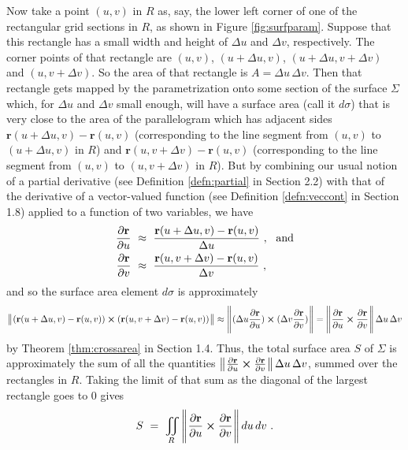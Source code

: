 Now take a point $(u,v)$ in $R$ as, say,
the lower left corner of one of the rectangular grid sections in $R$, as shown in Figure \ref{fig:surfparam}. Suppose
that this rectangle has a small width and height of $\Delta u$ and $\Delta v$, respectively. The corner points of that
rectangle are $(u,v)$, $(u+\Delta u,v)$, $(u+\Delta u,v+\Delta v)$ and $(u,v+\Delta v)$.
So the area of that
rectangle is $A = \Delta u\,\Delta v$. Then that rectangle gets mapped by the parametrization onto some section of the
surface $\Sigma$ which, for $\Delta u$ and $\Delta v$ small enough, will have a surface area (call it $d\sigma$) that
is very close to the area of the parallelogram which has adjacent sides $\mathbf{r}(u+\Delta u,v) - \mathbf{r}(u,v)$
(corresponding to the line segment from $(u,v)$ to $(u+\Delta u,v)$ in $R$) and
$\mathbf{r}(u,v+\Delta v) - \mathbf{r}(u,v)$ (corresponding to the line segment from $(u,v)$ to $(u,v+\Delta v)$ in
$R$). But by combining our usual notion of a partial derivative (see Definition \ref{defn:partial} in
Section 2.2) with that of the derivative of a vector-valued function (see Definition \ref{defn:veccont} in
Section 1.8) applied to a function of two variables, we have
\begin{align*}
 \frac{\partial \mathbf{r}}{\partial u} ~&\approx~ \frac{\mathbf{r}(u+\Delta u,v) - \mathbf{r}(u,v)}{\Delta u}
 ~,~~\text{and}\smallskip\\
 \frac{\partial \mathbf{r}}{\partial v} ~&\approx~ \frac{\mathbf{r}(u,v+\Delta v) - \mathbf{r}(u,v)}{\Delta v} ~,
\end{align*}
and so the surface area element $d\sigma$ is approximately
\begin{displaymath}
 \bigl\lVert\mspace{1mu}(\mathbf{r}(u+\Delta u,v) - \mathbf{r}(u,v)) \bm{\times} (\mathbf{r}(u,v+\Delta v) - \mathbf{r}(u,v))\mspace{1mu}\bigr\rVert \approx
 \Biggl\lVert\mspace{1mu}(\Delta u \frac{\partial \mathbf{r}}{\partial u}) \bm{\times} (\Delta v\frac{\partial \mathbf{r}}{\partial v})\mspace{1mu}\Biggr\rVert
 = \Biggl\lVert\mspace{1mu}\frac{\partial \mathbf{r}}{\partial u} \bm{\times} \frac{\partial \mathbf{r}}{\partial v}\mspace{1mu}\Biggr\rVert\,
 \Delta u \, \Delta v
\end{displaymath}
by Theorem \ref{thm:crossarea} in Section 1.4.
Thus, the total surface area $S$ of $\Sigma$ is approximately the sum of all the quantities
$\bigl\lVert\mspace{1mu}\frac{\partial \mathbf{r}}{\partial u} \bm{\times} \frac{\partial \mathbf{r}}{\partial v}\mspace{1mu}\bigr\rVert\,\Delta u\,\Delta v$,
summed over the rectangles in $R$. Taking the limit of that sum as the diagonal of the largest rectangle goes to $0$
gives
\begin{equation}
 S ~=~ \iint\limits_{R}\,\Biggl\lVert\mspace{1mu}\frac{\partial \mathbf{r}}{\partial u} \bm{\times} \frac{\partial \mathbf{r}}{\partial v}\mspace{1mu}\Biggr\rVert
 \,du\,dv ~.
\end{equation}
